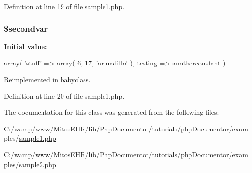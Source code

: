 \-Definition at line 19 of file sample1.\-php.

\hypertarget{classmyclass_a380d4f7424ae53505c6ce9bf5a39dffd}{
\subsubsection[{\$secondvar}]{\setlength{\rightskip}{0pt plus 5cm}\$secondvar}}\label{classmyclass_a380d4f7424ae53505c6ce9bf5a39dffd}
{\bfseries \-Initial value\-:}
\begin{DoxyCode}

        array(
            'stuff' =>
                array(
                    6,
                    17,
                    'armadillo'
                ),
            testing => anotherconstant
        )
\end{DoxyCode}


\-Reimplemented in \hyperlink{classbabyclass_a380d4f7424ae53505c6ce9bf5a39dffd}{babyclass}.



\-Definition at line 20 of file sample1.\-php.



\-The documentation for this class was generated from the following files\-:\begin{DoxyCompactItemize}
\item 
\-C\-:/wamp/www/\-Mitos\-E\-H\-R/lib/\-Php\-Documentor/tutorials/php\-Documentor/examples/\hyperlink{sample1_8php}{sample1.\-php}\item 
\-C\-:/wamp/www/\-Mitos\-E\-H\-R/lib/\-Php\-Documentor/tutorials/php\-Documentor/examples/\hyperlink{sample2_8php}{sample2.\-php}\end{DoxyCompactItemize}

